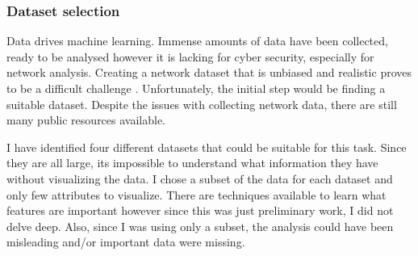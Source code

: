 \documentclass[11pt]{article}
\begin{document}
\subsubsection{Dataset selection} \label{Dataset selection}
Data drives machine learning. Immense amounts of data have been collected, ready to be analysed however it is lacking for cyber security, especially for network analysis. Creating a network dataset that is unbiased and realistic proves to be a difficult challenge \cite{bg-dataset-selection}. Unfortunately, the initial step would be finding a suitable dataset. Despite the issues with collecting network data, there are still many public resources available. 

I have identified four different datasets that could be suitable for this task. Since they are all large, its impossible to understand what information they have without visualizing the data. I chose a subset of the data for each dataset and only few attributes to visualize. There are techniques available to learn what features are important however since this was just preliminary work, I did not delve deep. Also, since I was using only a subset, the analysis could have been misleading and/or important data were missing.
\end{document}
